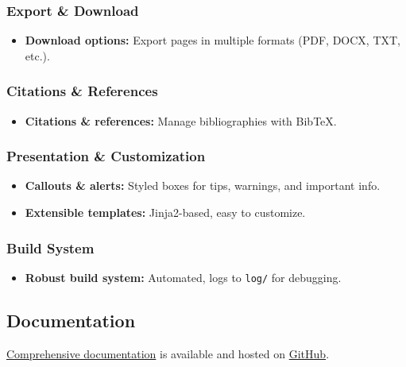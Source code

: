 \subsubsection{Export \& Download}\label{export-download}

\begin{itemize}
\tightlist
\item
  \textbf{Download options:} Export pages in multiple formats (PDF,
  DOCX, TXT, etc.).
\end{itemize}

\subsubsection{Citations \& References}\label{citations-references}

\begin{itemize}
\tightlist
\item
  \textbf{Citations \& references:} Manage bibliographies with BibTeX.
\end{itemize}

\subsubsection{Presentation \&
Customization}\label{presentation-customization}

\begin{itemize}
\tightlist
\item
  \textbf{Callouts \& alerts:} Styled boxes for tips, warnings, and
  important info.
\item
  \textbf{Extensible templates:} Jinja2-based, easy to customize.
\end{itemize}

\subsubsection{Build System}\label{build-system}

\begin{itemize}
\tightlist
\item
  \textbf{Robust build system:} Automated, logs to \texttt{log/} for
  debugging.
\end{itemize}

\subsection{Documentation}\label{documentation}

\href{https://oer-forge.github.io/docs/}{Comprehensive documentation} is
available and hosted on
\href{https://github.com/OER-Forge/docs}{GitHub}.

